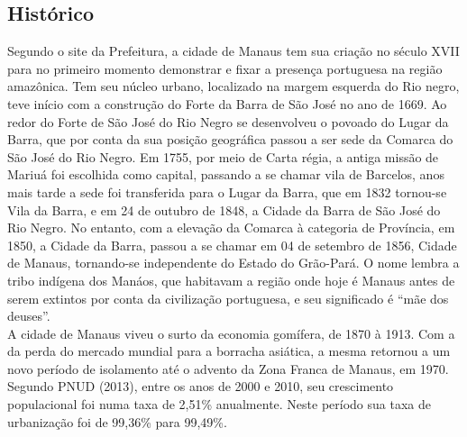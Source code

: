 \subsection{Histórico}
\hspace{1.5cm}
Segundo o site da Prefeitura, a cidade de Manaus tem sua criação no século XVII para no primeiro momento demonstrar e fixar a presença portuguesa na região amazônica. Tem seu núcleo urbano, localizado na margem esquerda do Rio negro, teve início com a construção do Forte da Barra de São José no ano de 1669. Ao redor do Forte de São José do Rio Negro se desenvolveu o povoado do Lugar da Barra, que por conta da sua posição geográfica passou a ser sede da Comarca do São José do Rio Negro. Em 1755, por meio de Carta régia, a antiga missão de Mariuá foi escolhida como capital, passando a se chamar vila de Barcelos, anos mais tarde a sede foi transferida para o Lugar da Barra, que em 1832 tornou-se Vila da Barra, e em 24 de outubro de 1848, a Cidade da Barra de São José do Rio Negro. No entanto, com a elevação da Comarca à categoria de Província, em 1850, a Cidade da Barra, passou a se chamar em 04 de setembro de 1856, Cidade de Manaus, tornando-se independente do Estado do Grão-Pará. O nome lembra a tribo indígena dos Manáos, que habitavam a região onde hoje é Manaus antes de serem extintos por conta da civilização portuguesa, e seu significado é “mãe dos deuses”.\\

\hspace{1.5cm}
A cidade de Manaus viveu o surto da economia gomífera, de 1870 à 1913. Com a da perda do mercado mundial para a borracha asiática, a mesma retornou a um novo período de isolamento até o advento da Zona Franca de Manaus, em 1970. Segundo PNUD (2013)\cite{pnud2013}, entre os anos de 2000 e 2010, seu crescimento populacional foi numa taxa de 2,51\% anualmente. Neste período sua taxa de urbanização foi de 99,36\% para  99,49\%.